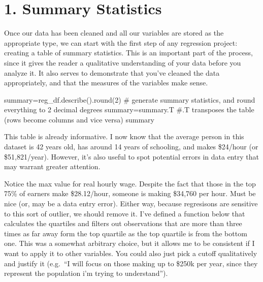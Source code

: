 \documentclass[
  letterpaper,
  DIV=11,
  numbers=noendperiod]{scrreprt}
\newenvironment{Shaded}{\begin{snugshade}}{\end{snugshade}}
\newcommand{\BuiltInTok}[1]{\textcolor[rgb]{0.00,0.23,0.31}{#1}}
\newcommand{\CommentTok}[1]{\textcolor[rgb]{0.37,0.37,0.37}{#1}}
\newcommand{\DecValTok}[1]{\textcolor[rgb]{0.68,0.00,0.00}{#1}}
\newcommand{\NormalTok}[1]{\textcolor[rgb]{0.00,0.23,0.31}{#1}}
\newcommand{\OperatorTok}[1]{\textcolor[rgb]{0.37,0.37,0.37}{#1}}
\begin{document}
\hypertarget{summary-statistics-1}{%
\section{1. Summary Statistics}\label{summary-statistics-1}}

Once our data has been cleaned and all our variables are stored as the
appropriate type, we can start with the first step of any regression
project: creating a table of summary statistics. This is an important
part of the process, since it gives the reader a qualitative
understanding of your data before you analyze it. It also serves to
demonstrate that you've cleaned the data appropriately, and that the
measures of the variables make sense.

\begin{Shaded}
\begin{Highlighting}[]
\NormalTok{summary}\OperatorTok{=}\NormalTok{reg\_df.describe().}\BuiltInTok{round}\NormalTok{(}\DecValTok{2}\NormalTok{)  }\CommentTok{\# generate summary statistics, and round everything to 2 decimal degrees}
\NormalTok{summary}\OperatorTok{=}\NormalTok{summary.T }\CommentTok{\#.T transposes the table (rows become columns and vice versa)}
\NormalTok{summary}
\end{Highlighting}
\end{Shaded}

This table is already informative. I now know that the average person in
this dataset is 42 years old, has around 14 years of schooling, and
makes \$24/hour (or \$51,821/year). However, it's also useful to spot
potential errors in data entry that may warrant greater attention.

Notice the max value for real hourly wage. Despite the fact that those
in the top 75\% of earners make \$28.12/hour, someone is making \$34,760
per hour. Must be nice (or, may be a data entry error). Either way,
because regresisons are sensitive to this sort of outlier, we should
remove it. I've defined a function below that calculates the quartiles
and filters out observations that are more than three times as far away
form the top quartile as the top quartile is from the bottom one. This
was a somewhat arbitrary choice, but it allows me to be consistent if I
want to apply it to other variables. You could also just pick a cutoff
qualitatively and justify it (e.g.~``I will focus on those making up to
\$250k per year, since they represent the population i'm trying to
understand'').
\end{document}
